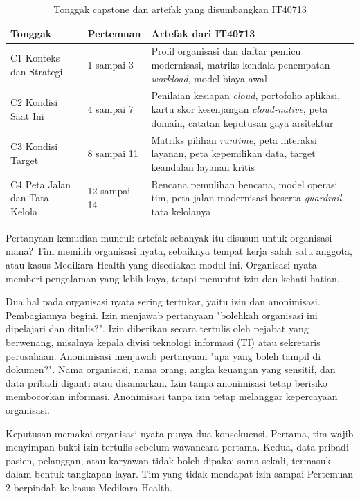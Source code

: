 \begin{table}[!htb]
  \centering
  \small
  \caption{Tonggak capstone dan artefak yang disumbangkan IT40713}
  \label{tab:ch01-tonggak}
  \begin{tabularx}{\textwidth}{P{2.6cm}P{1.8cm}L}
    \hline
    \textbf{Tonggak} & \textbf{Pertemuan} & \textbf{Artefak dari IT40713} \\
    \hline
    C1 Konteks dan Strategi & 1 sampai 3 & Profil organisasi dan daftar pemicu
      modernisasi, matriks kendala penempatan \textit{workload}, model biaya awal \\
    \hline
    C2 Kondisi Saat Ini & 4 sampai 7 & Penilaian kesiapan \textit{cloud}, portofolio
      aplikasi, kartu skor kesenjangan \textit{cloud-native}, peta domain, catatan
      keputusan gaya arsitektur \\
    \hline
    C3 Kondisi Target & 8 sampai 11 & Matriks pilihan \textit{runtime}, peta interaksi
      layanan, peta kepemilikan data, target keandalan layanan kritis \\
    \hline
    C4 Peta Jalan dan Tata Kelola & 12 sampai 14 & Rencana pemulihan bencana, model
      operasi tim, peta jalan modernisasi beserta \textit{guardrail} tata kelolanya \\
    \hline
  \end{tabularx}
\end{table}

Pertanyaan kemudian muncul: artefak sebanyak itu disusun untuk organisasi mana? Tim
memilih organisasi nyata, sebaiknya tempat kerja salah satu anggota, atau kasus
Medikara Health yang disediakan modul ini. Organisasi nyata memberi pengalaman yang
lebih kaya, tetapi menuntut izin dan kehati-hatian.

Dua hal pada organisasi nyata sering tertukar, yaitu izin dan anonimisasi. Pembagiannya
begini. Izin menjawab pertanyaan "bolehkah organisasi ini dipelajari dan ditulis?".
Izin diberikan secara tertulis oleh pejabat yang berwenang, misalnya kepala divisi
teknologi informasi (TI) atau sekretaris perusahaan. Anonimisasi menjawab pertanyaan
"apa yang boleh tampil di dokumen?". Nama organisasi, nama orang, angka keuangan yang
sensitif, dan data pribadi diganti atau disamarkan. Izin tanpa anonimisasi tetap
berisiko membocorkan informasi. Anonimisasi tanpa izin tetap melanggar kepercayaan
organisasi.

Keputusan memakai organisasi nyata punya dua konsekuensi. Pertama, tim wajib menyimpan
bukti izin tertulis sebelum wawancara pertama. Kedua, data pribadi pasien, pelanggan,
atau karyawan tidak boleh dipakai sama sekali, termasuk dalam bentuk tangkapan layar.
Tim yang tidak mendapat izin sampai Pertemuan 2 berpindah ke kasus Medikara Health.

